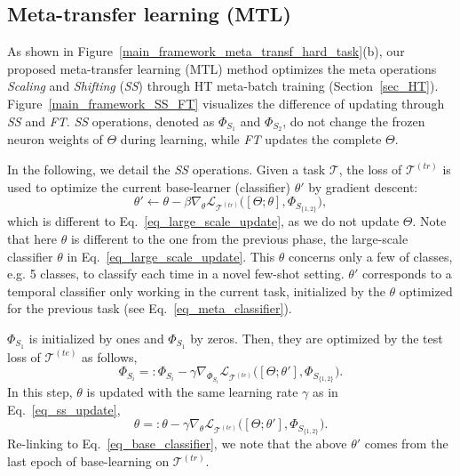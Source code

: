 
\subsection{Meta-transfer learning (MTL)}
\label{sec_meta_transfer}

As shown in Figure~\ref{main_framework_meta_transf_hard_task}(b), our proposed meta-transfer learning (MTL) method optimizes the meta operations \emph{Scaling} and \emph{Shifting} (\emph{SS}) through HT meta-batch training (Section~\ref{sec_HT}). 
%
Figure~\ref{main_framework_SS_FT} visualizes the difference of updating through \emph{SS} and \emph{FT}.
\emph{SS} operations, denoted as $\Phi_{S_1}$ and $\Phi_{S_2}$, do not change the frozen neuron weights of $\Theta$ during learning, while \emph{FT} updates the complete $\Theta$. 
%

In the following, we detail the \emph{SS} operations.
%
%
Given a task $\mathcal{T}$, the loss of $\mathcal{T}^{(tr)}$ is used to optimize the current base-learner (classifier) $\theta'$ by gradient descent:
\begin{equation}\label{eq_base_classifier}
  \theta' \gets \theta - \beta\nabla_{\theta}\mathcal{L}_{\mathcal{T}^{(tr)}}\big([\Theta; \theta], \Phi_{S_{\{1,2\}}}\big),
\end{equation}
which is different to Eq.~\ref{eq_large_scale_update}, as we do not update $\Theta$. 
Note that here $\theta$ is different to the one from the previous phase, the large-scale classifier $\theta$ in Eq.~\ref{eq_large_scale_update}. 
%
This $\theta$ concerns only a few of classes, e.g. 5 classes, to classify each time in a novel few-shot setting. 
%
$\theta'$ corresponds to a temporal classifier only working in the current task, initialized by the $\theta$ optimized for the previous task (see Eq.~\ref{eq_meta_classifier}). 


$\Phi_{S_1}$ is initialized by ones and $\Phi_{S_1}$ by zeros. Then, they are optimized by the test loss of $\mathcal{T}^{(te)}$ as follows,
%
\begin{equation}\label{eq_ss_update}
     \Phi_{S_i} =: \Phi_{S_i} - \gamma\nabla_{\Phi_{S_i}}\mathcal{L}_{\mathcal{T}^{(te)}}\big([\Theta; \theta'], \Phi_{S_{\{1,2\}}}\big).
\end{equation}
%
%
In this step, $\theta$ is updated with the same learning rate $\gamma$ as in Eq.~\ref{eq_ss_update},
\begin{equation}\label{eq_meta_classifier}
  \theta =: \theta - \gamma\nabla_{\theta}\mathcal{L}_{\mathcal{T}^{(te)}}\big([\Theta; \theta'], \Phi_{S_{\{1,2\}}}\big).
\end{equation}
Re-linking to Eq.~\ref{eq_base_classifier}, we note that the above $\theta'$ comes from the last epoch of base-learning on $\mathcal{T}^{(tr)}$.

